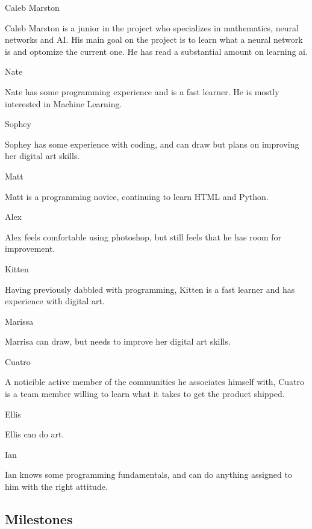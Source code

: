 \documentclass[11pt]{article}
\begin{document}
{\large {\color{orange}Caleb Marston}}

Caleb Marston is a junior in the project who specializes in mathematics, neural networks and AI. His main goal on the project is to learn what a neural network is and optomize the current one. He has read a substantial amount on learning ai.

{\large {\color{orange}Nate}}

Nate has some programming experience and is a fast learner. He is mostly interested in Machine Learning.


{\large {\color{orange}Sophey}}

Sophey has some experience with coding, and can draw but plans on improving her digital art skills.

{\large {\color{orange}Matt}}

Matt is a programming novice, continuing to learn HTML and Python.

{\large {\color{orange}Alex}}

Alex feels comfortable using photoshop, but still feels that he has room for improvement.

{\large {\color{orange}Kitten}}

Having previously dabbled with programming, Kitten is a fast learner and has experience with digital art.


{\large {\color{orange}Marissa}}

Marrisa can draw, but needs to improve her digital art skills.

{\large {\color{orange}Cuatro}}

A noticible active member of the communities he associates himself with, Cuatro is a team member willing to learn what it takes to get the product shipped.

{\large {\color{orange}Ellis}}

Ellis can do art.

{\large {\color{orange}Ian}}

Ian knows some programming fundamentals, and can do anything assigned to him with the right attitude.


\subsection{{\color{blue}Milestones}}
\end{document}
